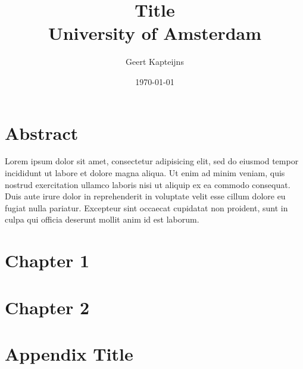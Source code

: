 \documentclass[12pt, oneside]{memoir}
\begin{document}
\title{
  {Title}\\
  {\large University of Amsterdam}
}
\author{Geert Kapteijns}
\date{\today}

\maketitle

\chapter*{Abstract}
Lorem ipsum dolor sit amet, consectetur adipisicing elit, sed do eiusmod tempor incididunt
ut labore et dolore magna aliqua. Ut enim ad minim veniam, quis nostrud exercitation
ullamco laboris nisi ut aliquip ex ea commodo consequat. Duis aute irure dolor in
reprehenderit in voluptate velit esse cillum dolore eu fugiat nulla pariatur. Excepteur
sint occaecat cupidatat non proident, sunt in culpa qui officia deserunt mollit anim id
est laborum.

\tableofcontents

\chapter{Chapter 1}


\chapter{Chapter 2}


\appendix
\chapter{Appendix Title}

\end{document}
